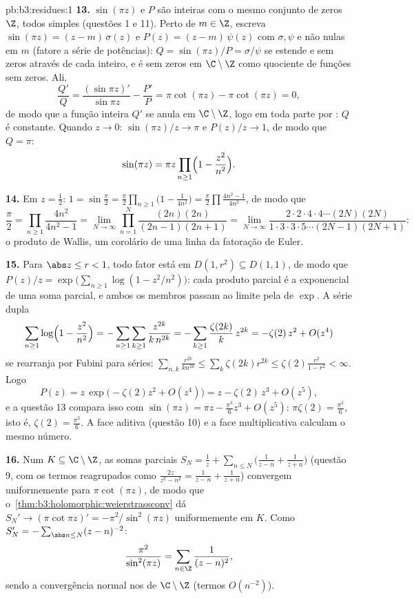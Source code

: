 \begin{solution}{pb:b3:residues:1}
\textbf{13.} $\sin(\pi z)$ e $P$ são inteiras com o mesmo
conjunto de zeros $\Z$, todos simples (questões 1 e 11). Perto de
$m \in \Z$, escreva $\sin(\pi z) = (z - m)\,\sigma(z)$ e
$P(z) = (z - m)\,\psi(z)$ com $\sigma, \psi$ 
e não nulas em $m$ (fatore a série de potências): $Q =
\sin(\pi z)/P = \sigma/\psi$ se estende  e
sem zeros através de cada inteiro, e é sem zeros em
$\C\setminus\Z$ como quociente de funções sem zeros. Ali,
\[
\frac{Q'}{Q} = \frac{(\sin\pi z)'}{\sin\pi z} -
\frac{P'}{P} = \pi\cot(\pi z) - \pi\cot(\pi z) = 0 ,
\]
de modo que a função inteira $Q'$ se anula em $\C\setminus\Z$,
logo em toda parte por : $Q$ é constante. Quando $z \to
0$: $\sin(\pi z)/z \to \pi$ e $P(z)/z \to 1$, de modo que $Q =
\pi$:
\[
\sin(\pi z) = \pi z\prod_{n\geq1}
\Bigl(1 - \frac{z^2}{n^2}\Bigr) .
\]

\textbf{14.} Em $z = \frac12$: $1 = \sin\frac\pi2 =
\frac\pi2\prod_{n\geq1}\bigl(1 - \frac1{4n^2}\bigr) =
\frac\pi2\prod\frac{4n^2-1}{4n^2}$, de modo que
\[
\frac\pi2 = \prod_{n\geq1}\frac{4n^2}{4n^2 - 1}
= \lim_{N\to\infty}\prod_{n=1}^N
\frac{(2n)(2n)}{(2n-1)(2n+1)}
= \lim_{N\to\infty}
\frac{2\cdot2\cdot4\cdot4\cdots(2N)(2N)}
{1\cdot3\cdot3\cdot5\cdots(2N-1)(2N+1)} :
\]
o produto de Wallis, um corolário de uma linha da fatoração de
Euler.

\textbf{15.} Para $\abs z \leq r < 1$, todo fator está em
$D(1, r^2) \subseteq D(1, 1)$, de modo que $P(z)/z = \exp\bigl(
\sum_{n\geq1}\log(1 - z^2/n^2)\bigr)$: cada produto parcial
é a exponencial de uma soma parcial, e ambos os membros passam
ao limite pela  de $\exp$. A série dupla
\[
\sum_{n\geq1}\log\Bigl(1 - \frac{z^2}{n^2}\Bigr)
= -\sum_{n\geq1}\sum_{k\geq1}\frac{z^{2k}}{k\,n^{2k}}
= -\sum_{k\geq1}\frac{\zeta(2k)}k\,z^{2k}
= -\zeta(2)\,z^2 + O(z^4)
\]
se rearranja por Fubini para séries: $\sum_{n,k}
\frac{r^{2k}}{kn^{2k}} \leq \sum_k\zeta(2k)r^{2k} \leq
\zeta(2)\frac{r^2}{1-r^2} < \infty$. Logo
\[
P(z) = z\,\exp\bigl(-\zeta(2)z^2 + O(z^4)\bigr)
= z - \zeta(2)\,z^3 + O(z^5) ,
\]
e a questão 13 compara isso com $\sin(\pi z) = \pi z -
\frac{\pi^3}6z^3 + O(z^5)$: $\pi\zeta(2) = \frac{\pi^3}6$,
isto é, $\zeta(2) = \frac{\pi^2}6$. A face aditiva
(questão 10) e a face multiplicativa calculam o mesmo
número.

\textbf{16.} Num  $K \subseteq \C\setminus\Z$, as
somas parciais $S_N = \frac1z + \sum_{n\leq N}\bigl(
\frac1{z-n} + \frac1{z+n}\bigr)$ (questão 9, com os termos
reagrupados como $\frac{2z}{z^2-n^2} = \frac1{z-n} +
\frac1{z+n}$) convergem uniformemente para $\pi\cot(\pi z)$, de modo que
o~\cref{thm:b3:holomorphic:weierstrassconv} dá $S_N' \to
(\pi\cot\pi z)' = -\pi^2/\sin^2(\pi z)$ uniformemente em $K$.
Como $S_N' = -\sum_{\abs n\leq N}(z - n)^{-2}$:
\[
\frac{\pi^2}{\sin^2(\pi z)} =
\sum_{n\in\Z}\frac1{(z - n)^2} ,
\]
sendo a convergência normal nos  de $\C\setminus\Z$
(termos $O(n^{-2})$).


\end{solution}
